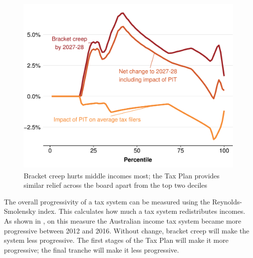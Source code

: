 \documentclass[submission]{grattan}\usepackage[]{graphicx}\usepackage[]{color}
\newenvironment{knitrout}{}{} %
\begin{document}
\begin{figure}
\caption{Bracket creep hurts middle incomes most; the Tax Plan provides similar relief across the board apart from the top two deciles}\label{fig:3}
\begin{knitrout}
\color{fgcolor}
\includegraphics[width=4.47222in,height=3.51158068592058in]{atlas/fig3-1} 

\end{knitrout}
\end{figure}

The overall progressivity of a tax system can be measured using the Reynolds-Smolensky index. This calculates how much a tax system redistributes incomes.
As shown in , on this measure the Australian income tax system became more progressive between 2012 and 2016. Without change, bracket creep will make the system less progressive. The first stages of the Tax Plan will make it more progressive; the final tranche will make it less progressive.
\end{document}
